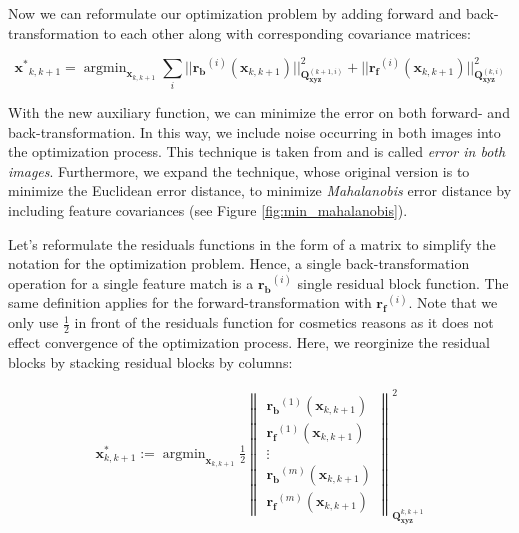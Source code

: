\documentclass[a4paper]{report}
\numberwithin{figure}{section}
\newcommand{\argmin}{\mathop{\mathrm{argmin}}}
\begin{document}
Now we can reformulate our optimization problem by adding forward and
back-transformation to each other along with corresponding covariance matrices:

\begin{equation} \label{eq:residuals_w_back_and_forward} \mathbf{x^*}_{k,k+1} =
\argmin_{\mathbf{x}_{k,k+1}} \sum_i
||\mathbf{r_b}^{(i)}(\mathbf{x}_{k,k+1})||^2_{\mathbf{Q}^{(k+1,i)}_{\mathbf{xyz}}}+
||\mathbf{r_f}^{(i)}(\mathbf{x}_{k,k+1})
||^2_{\mathbf{Q}^{(k,i)}_{\mathbf{xyz}}} \end{equation}

With the new auxiliary function, we can minimize the error on both forward- and
back-transformation.  In this way, we include noise occurring in both images
into the optimization process. This technique is taken from
\parencite[see][101]{RichardHartley2003} and is called \textit{error in both 
images}.
Furthermore, we expand the technique, whose original version is to minimize the
Euclidean error distance, to minimize \textit{Mahalanobis} error distance by
including feature covariances (see Figure \ref{fig:min_mahalanobis}).

Let's reformulate the residuals functions in the form of a matrix to simplify
the notation for the optimization problem.  Hence, a single back-transformation
operation for a single feature match is a $\mathbf{r_b}^{(i)}$ single residual
block function.  The same definition applies for the forward-transformation
with $\mathbf{r_f}^{(i)}$.  Note that we only use $\frac{1}{2}$ in front of the
residuals function for cosmetics reasons as it does not effect convergence of
the optimization process.  Here, we reorginize the residual blocks by stacking
residual blocks by columns:

\begin{equation} \label{eq:residuals_w_back_and_forward_matrix}
  \begin{aligned} \mathbf{x}^*_{k,k+1} :=
\argmin_{\mathbf{x}_{k,k+1}} \frac{1}{2} \begin{Vmatrix}
\mathbf{r_b}^{(1)}(\mathbf{x}_{k,k+1}) \\
\mathbf{r_f}^{(1)}(\mathbf{x}_{k,k+1}) \\ \vdots \\
\mathbf{r_b}^{(m)}(\mathbf{x}_{k,k+1}) \\
\mathbf{r_f}^{(m)}(\mathbf{x}_{k,k+1})
\end{Vmatrix}^2_{\mathbf{Q}^{k,k+1}_{\mathbf{xyz}}}
\end{aligned} \end{equation}
\end{document}
